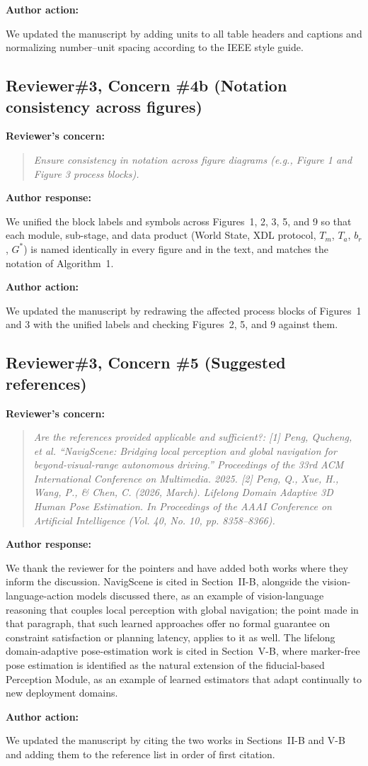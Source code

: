 \documentclass[11pt]{article}
\newif\ifshowstatus
\newcommand{\statusline}[2]{\ifshowstatus\par\noindent\textcolor{status#1}{\textbf{Status: \MakeUppercase{#1}.} #2}\par\smallskip\fi}
\newenvironment{concern}[3][pending]{\subsection*{\ifshowstatus\textcolor{status#1}{#2}\else#2\fi}\statusline{#1}{#3}\textbf{Reviewer's concern:}\begin{quote}\itshape}{\end{quote}}
\newenvironment{response}{\textbf{Author response:}\par\smallskip}{\par\medskip}
\newenvironment{action}{\textbf{Author action:}\par\smallskip}{\par\bigskip\noindent\hrulefill\par\bigskip}
\begin{document}
\begin{action}
We updated the manuscript by adding units to all table headers and captions and normalizing number--unit spacing according to the IEEE style guide.
\end{action}

\begin{concern}[complete]{Reviewer\#3, Concern \#4b (Notation consistency across figures)}{Editorial only; Figures 1 and 3 need redrawing (no data involved).}
Ensure consistency in notation across figure diagrams (e.g., Figure 1 and Figure 3 process blocks).
\end{concern}

\begin{response}
We unified the block labels and symbols across Figures~1, 2, 3, 5, and 9 so that each module, sub-stage, and data product (World State, XDL protocol, $T_m$, $T_a$, $b_r$, $G^*$) is named identically in every figure and in the text, and matches the notation of Algorithm~1.
\end{response}

\begin{action}
We updated the manuscript by redrawing the affected process blocks of Figures~1 and 3 with the unified labels and checking Figures~2, 5, and 9 against them.
\end{action}

\begin{concern}[complete]{Reviewer\#3, Concern \#5 (Suggested references)}{Already applied in access\_revised.tex as references [21] and [32].}
Are the references provided applicable and sufficient?:
[1] Peng, Qucheng, et al. ``NavigScene: Bridging local perception and global navigation for beyond-visual-range autonomous driving.'' Proceedings of the 33rd ACM International Conference on Multimedia. 2025.
[2] Peng, Q., Xue, H., Wang, P., \& Chen, C. (2026, March). Lifelong Domain Adaptive 3D Human Pose Estimation. In Proceedings of the AAAI Conference on Artificial Intelligence (Vol. 40, No. 10, pp. 8358--8366).
\end{concern}

\begin{response}
We thank the reviewer for the pointers and have added both works where they inform the discussion.
NavigScene is cited in Section~II-B, alongside the vision-language-action models discussed there, as an example of vision-language reasoning that couples local perception with global navigation; the point made in that paragraph, that such learned approaches offer no formal guarantee on constraint satisfaction or planning latency, applies to it as well.
The lifelong domain-adaptive pose-estimation work is cited in Section~V-B, where marker-free pose estimation is identified as the natural extension of the fiducial-based Perception Module, as an example of learned estimators that adapt continually to new deployment domains.
\end{response}

\begin{action}
We updated the manuscript by citing the two works in Sections~II-B and V-B and adding them to the reference list in order of first citation.
\end{action}
\end{document}
